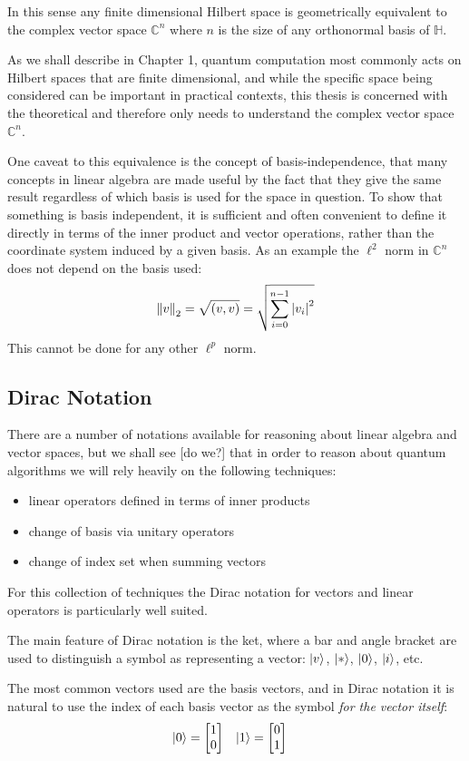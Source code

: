 In this sense any finite dimensional Hilbert space is geometrically equivalent to the complex vector space $\mathbb{C}^n$ where $n$ is the size of any orthonormal basis of $\mathbb{H}$.

As we shall describe in Chapter 1, quantum computation most commonly acts on Hilbert spaces that are finite dimensional, and while the specific space being considered can be important in practical contexts, this thesis is concerned with the theoretical and therefore only needs to understand the complex vector space $\mathbb{C}^n$.

One caveat to this equivalence is the concept of basis-independence, that many concepts in linear algebra are made useful by the fact that they give the same result regardless of which basis is used for the space in question. To show that something is basis independent, it is sufficient and often convenient to define it directly in terms of the inner product and vector operations, rather than the coordinate system induced by a given basis. As an example the $\ell^2$ norm in $\mathbb{C}^n$ does not depend on the basis used:
\[\left\Vert v \right\Vert_2 = \sqrt{(v, v)} = \sqrt{\sum_{i=0}^{n-1}\left| v_i \right|^2}\]
This cannot be done for any other $\ell^p$ norm.

\subsection{Dirac Notation}
There are a number of notations available for reasoning about linear algebra and vector spaces, but we shall see [do we?] that in order to reason about quantum algorithms we will rely heavily on the following techniques:
\begin{itemize}
	\item linear operators defined in terms of inner products
	\item change of basis via unitary operators
	\item change of index set when summing vectors
\end{itemize}
For this collection of techniques the Dirac notation for vectors and linear operators is particularly well suited.

The main feature of Dirac notation is the ket, where a bar and angle bracket are used to distinguish a symbol as representing a vector: $| v \rangle$, $| * \rangle$, $| 0 \rangle$, $| i \rangle$, etc.

The most common vectors used are the basis vectors, and in Dirac notation it is natural to use the index of each basis vector as the symbol \textit{for the vector itself}:
\begin{align*}
	| 0 \rangle = \left[\begin{matrix}
		1\\
		0
	\end{matrix}\right]
	&&&
	| 1 \rangle = \left[\begin{matrix}
		0\\
		1
	\end{matrix}\right]
\end{align*}

